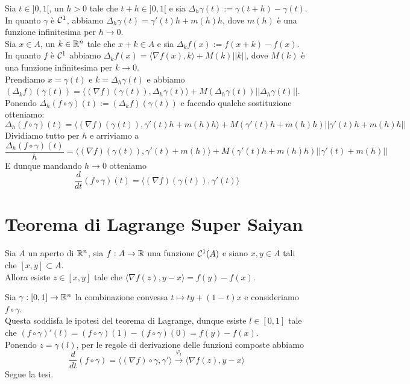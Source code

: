 \documentclass[openany]{book}
\begin{document}
    Sia $t \in ]0,1[$, un $h>0$ tale che $t+h \in ]0,1[$ e sia $\Delta_h \gamma(t) := \gamma(t+h)-\gamma(t)$.\\
    In quanto $\gamma$ è $\mathcal{C}^1$, abbiamo $\Delta_h \gamma(t) = \gamma'(t) h + m(h)h$, dove $m(h)$ è una funzione infinitesima per $h\to 0$.\\
    Sia $x \in A$, un $k\in \mathbb{R}^n$ tale che $x+k \in A$ e sia $\Delta_k f(x) := f(x+k)- f(x)$.\\
    In quanto $f$ è $\mathcal{C}^1$ abbiamo $\Delta_k f(x) = \langle\nabla f(x), k\rangle + M(k)||k||$, dove $M(k)$ è una funzione infinitesima per $k\to 0$.\\
    Prendiamo $x = \gamma(t)$ e $k = \Delta_h\gamma(t)$ e abbiamo $(\Delta_k f)(\gamma(t)) = \langle (\nabla f)(\gamma(t)), \Delta_h \gamma(t)\rangle + M(\Delta_h\gamma(t))||\Delta_h\gamma(t)||$.\\
    Ponendo $\Delta_h (f\circ \gamma)(t) := (\Delta_k f)(\gamma(t))$ e facendo qualche sostituzione otteniamo:
    \[\Delta_h (f\circ \gamma)(t) = \langle (\nabla f)(\gamma(t)), \gamma'(t) h + m(h)h\rangle + M(\gamma'(t) h + m(h)h)||\gamma'(t) h + m(h)h||\]
    Dividiamo tutto per $h$ e arriviamo a
    \[\frac{\Delta_h (f\circ \gamma)(t)}{h} = \langle (\nabla f)(\gamma(t)), \gamma'(t) + m(h)\rangle + M(\gamma'(t)h + m(h)h)||\gamma'(t) + m(h)||\]
    E dunque mandando $h\to 0$ otteniamo
    \[\frac{d}{dt}(f\circ\gamma)(t) = \langle (\nabla f)(\gamma(t)), \gamma'(t)\rangle\] 


\section{Teorema di Lagrange Super Saiyan}

\begin{theorem}{}{}
    Sia $A$ un aperto di $\mathbb{R}^n$, sia $f:A\to\mathbb{R}$ una funzione $\mathcal{C}^1(A)$ e siano $x,y \in A$ tali che $[x,y]\subset A$.\\
    Allora esiste $z \in [x,y]$ tale che $\langle\nabla f(z), y-x\rangle = f(y)-f(x)$.
\end{theorem}

    Sia $\gamma : [0,1]\to\mathbb{R}^n$ la combinazione convessa $t\mapsto ty + (1-t)x$ e consideriamo $f\circ \gamma$.\\
    Questa soddisfa le ipotesi del teorema di Lagrange, dunque esiste $l \in [0,1]$ tale che $(f\circ\gamma)'(l) = (f\circ\gamma)(1)-(f\circ\gamma)(0) = f(y)-f(x)$.\\
    Ponendo $z = \gamma(l)$, per le regole di derivazione delle funzioni composte abbiamo
    \[\frac{d}{dt}(f\circ\gamma) = \langle(\nabla f)\circ\gamma,\gamma'\rangle \xrightarrow{\varphi_l} \langle\nabla f(z),y-x\rangle\]
    Segue la tesi.
\end{document}
